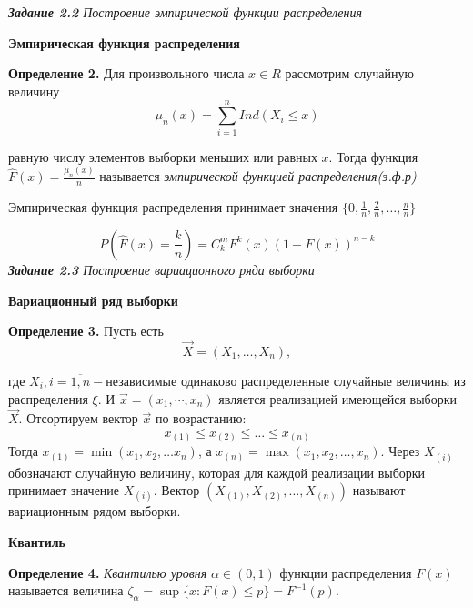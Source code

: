 \documentclass[a4paper,12pt, oneside]{book}
\begin{document}
\newpage
{\large\textit{\textbf{Задание 2.2} Построение эмпирической функции распределения}}


\vspace{5mm}
	\large{\textbf{Эмпирическая функция распределения}}
\vspace{5mm}

\normalsize{\textbf{Определение 2.}} Для произвольного числа $x \in R$ рассмотрим случайную величину
$$
\mu_n(x) = \sum\limits_{i=1}^n Ind(X_i \leq x )
$$

равную числу элементов выборки меньших или равных $x$. Тогда функция $\hat{F}(x) = \frac{\mu_n (x)}{n} $ называется \textit{эмпирической функцией распределения(э.ф.р)}

\vspace{3mm}
Эмпирическая функция распределения принимает значения $\{0,\frac{1}{n}, \frac{2}{n}, \ldots, \frac{n}{n} \}$

$$
P(\hat{F}(x) = \frac{k}{n}) = C_k^m F^k (x)(1-F(x))^{{n-k}}
$$
\newpage
{\large\textit{\textbf{Задание 2.3} Построение вариационного ряда выборки}}

\vspace{5mm}
\large{\textbf{Вариационный ряд выборки}}
\vspace{5mm}

\normalsize{\textbf{Определение 3.}} Пусть есть 
$$
\vec{X} = (X_1, \ldots , X_n),
$$

где $X_i, i=\overline{1,n} - $независимые одинаково распределенные случайные величины из распределения $\xi$. И $\vec{x} = (x_1, \cdots, x_n)$ является реализацией
имеющейся выборки $\vec{X}$. Отсортируем вектор $\vec{x}$ по возрастанию:
$$
x_{(1)} \leq x_{(2)} \leq \ldots \leq x_{(n)}
$$
Тогда $x_{(1)} = \min(x_1, x_2, \ldots x_n)$, а $x_{(n)} = \max(x_1, x_2, \ldots, x_n)$. Через $X_{(i)}$ 
обозначают случайную величину, которая для каждой реализации выборки
принимает значение $X_{(i)}$. Вектор $(X_{(1)}, X_{(2)}, \ldots, X_{(n)})$ называют вариационным рядом выборки.

\vspace{5mm}
\large{\textbf{Квантиль}}
\vspace{5mm}

\normalsize{\textbf{Определение 4.}} \textit{Квантилью уровня} $\alpha \in (0, 1)$ функции распределения $F(x)$ называется величина $\zeta_\alpha = \sup\{ x: F(x) \leq p \} = F^{-1}(p)$.
\end{document}
